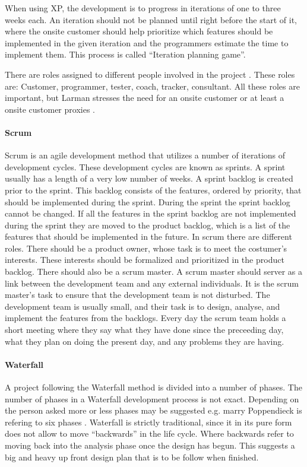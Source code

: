 When using XP, the development is to progress in iterations of one to three weeks each.
An iteration should not be planned until right before the start of it, where the onsite customer should help prioritize which features should be implemented in the given iteration and the programmers estimate the time to implement them.
This process is called ``Iteration planning game''.

There are roles assigned to different people involved in the project \cite[p.~145]{Larman04}.
These roles are: Customer, programmer, tester, coach, tracker, consultant.
All these roles are important, but Larman stresses the need for an onsite customer or at least a onsite customer proxies \cite[p.~152-156]{Larman04}.

\paragraph{Scrum}
Scrum is an agile development method that utilizes a number of iterations of development cycles.
These development cycles are known as sprints.
A sprint usually has a length of a very low number of weeks.
A sprint backlog is created prior to the sprint. 
This backlog consists of the features, ordered by priority, that should be implemented during the sprint.
During the sprint the sprint backlog cannot be changed.
If all the features in the sprint backlog are not implemented during the sprint they are moved to the product backlog, which is a list of the features that should be implemented in the future.
In scrum there are different roles. 
There should be a product owner, whose task is to meet the costumer's interests. 
These interests should be formalized and prioritized in the product backlog.
There should also be a scrum master. 
A scrum master should server as a link between the development team and any external individuals.
It is the scrum master's task to ensure that the development team is not disturbed.
The development team is usually small, and their task is to design, analyse, and implement the features from the backlogs.
Every day the scrum team holds a short meeting where they say what they have done since the preceeding day, what they plan on doing the present day, and any problems they are having.


\paragraph{Waterfall}
A project following the Waterfall method is divided into a number of phases.
The number of phases in a Waterfall development process is not exact.
Depending on the person asked more or less phases may be suggested e.g. marry Poppendieck is refering to six phases \cite{Poppendieck00}.
Waterfall is strictly traditional, since it in its pure form does not allow to move ``backwards'' in the life cycle.
Where backwards refer to moving back into the analysis phase once the design has begun.
This suggests a big and heavy up front design plan that is to be follow when finished.

